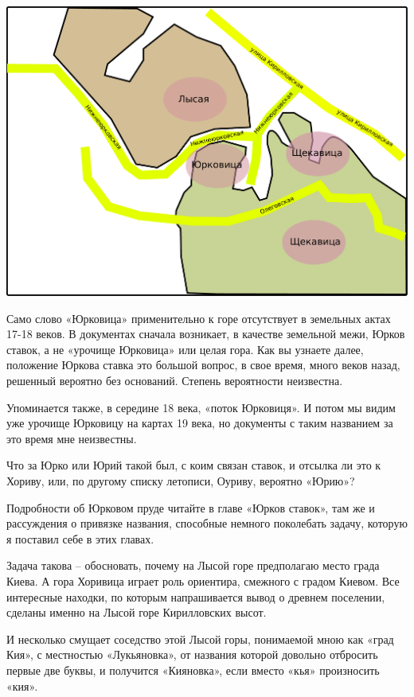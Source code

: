 \begin{center}
\includegraphics[width=\linewidth]{chast-kirvys/poisk-yourk/yourk-pravilno.pdf}
\end{center} 

Само слово «Юрковица» применительно к горе отсутствует в земельных актах 17-18 веков. В документах сначала возникает, в качестве земельной межи, Юрков ставок, а не «урочище Юрковица» или целая гора. Как вы узнаете далее, положение Юркова ставка это большой вопрос, в свое время, много веков назад, решенный вероятно без оснований. Степень вероятности неизвестна.

Упоминается также, в середине 18 века, «поток Юрковиця». И потом мы видим уже урочище Юрковицу на картах 19 века, но документы с таким названием за это время мне неизвестны.

Что за Юрко или Юрий такой был, с коим связан ставок, и отсылка ли это к Хориву, или, по другому списку летописи, Оуриву, вероятно «Юрию»?

Подробности об Юрковом пруде читайте в главе «Юрков ставок», там же и рассуждения о привязке названия, способные немного поколебать задачу, которую я поставил себе в этих главах.

Задача такова – обосновать, почему на Лысой горе предполагаю место града Киева. А гора Хоривица играет роль ориентира, смежного с градом Киевом. Все интересные находки, по которым напрашивается вывод о древнем поселении, сделаны именно на Лысой горе Кирилловских высот. 

И несколько смущает соседство этой Лысой горы, понимаемой мною как «град Кия», с местностью «Лукьяновка», от названия которой довольно отбросить первые две буквы, и получится «Кияновка», если вместо «кья» произносить «кия».

